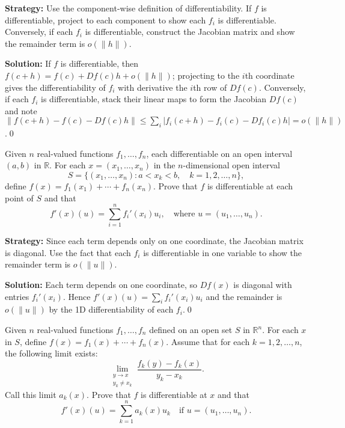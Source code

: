 \noindent\textbf{Strategy:} Use the component-wise definition of differentiability. If \( f \) is differentiable, project to each component to show each \( f_i \) is differentiable. Conversely, if each \( f_i \) is differentiable, construct the Jacobian matrix and show the remainder term is \( o(\|h\|) \).

\bigskip\noindent\textbf{Solution:}
If $f$ is differentiable, then $f(c+h)=f(c)+Df(c)h+o(\|h\|)$; projecting to the $i$th coordinate gives the differentiability of $f_i$ with derivative the $i$th row of $Df(c)$. Conversely, if each $f_i$ is differentiable, stack their linear maps to form the Jacobian $Df(c)$ and note $\|f(c+h)-f(c)-Df(c)h\|\le\sum_i |f_i(c+h)-f_i(c)-Df_i(c)h|=o(\|h\|)$.\qed


\begin{problembox}
Given \( n \) real-valued functions \( f_1, \ldots, f_n \), each differentiable on an open interval \( (a, b) \) in \( \mathbb{R} \). For each \( x = (x_1, \ldots, x_n) \) in the \( n \)-dimensional open interval
\[S = \{(x_1, \ldots, x_n): a < x_k < b, \quad k = 1, 2, \ldots, n\},\]
define \( f(x) = f_1(x_1) + \cdots + f_n(x_n) \). Prove that \( f \) is differentiable at each point of \( S \) and that
\[f'(x)(u) = \sum_{i=1}^{n} f_i'(x_i)u_i, \quad \text{where } u = (u_1, \ldots, u_n).\]
\end{problembox}

\noindent\textbf{Strategy:} Since each term depends only on one coordinate, the Jacobian matrix is diagonal. Use the fact that each \( f_i \) is differentiable in one variable to show the remainder term is \( o(\|u\|) \).

\bigskip\noindent\textbf{Solution:}
Each term depends on one coordinate, so $Df(x)$ is diagonal with entries $f_i'(x_i)$. Hence $f'(x)(u)=\sum_i f_i'(x_i)u_i$ and the remainder is $o(\|u\|)$ by the 1D differentiability of each $f_i$.\qed


\begin{problembox}
Given \( n \) real-valued functions \( f_1, \ldots, f_n \) defined on an open set \( S \) in \( \mathbb{R}^n \). For each \( x \) in \( S \), define \( f(x) = f_1(x) + \cdots + f_n(x) \). Assume that for each \( k = 1, 2, \ldots, n \), the following limit exists:
\[\lim_{\substack{y \to x \\ y_k \neq x_k}} \frac{f_k(y) - f_k(x)}{y_k - x_k}.\]
Call this limit \( a_k(x) \). Prove that \( f \) is differentiable at \( x \) and that
\[f'(x)(u) = \sum_{k=1}^{n} a_k(x) u_k \quad \text{if } u = (u_1, \ldots, u_n).\]
\end{problembox}

